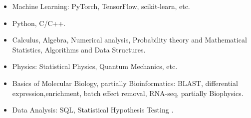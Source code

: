\documentclass[11pt]{article}
\begin{document}
\begin{multicols}{2}
\begin{itemize}
\columnbreak


\begin{itemize}

\item Machine Learning: PyTorch, TensorFlow, scikit-learn, etc.

\item Python, C/C++.

\item Calculus, Algebra, Numerical analysis, Probability theory and Mathematical Statistics, Algorithms and Data Structures.

\item Physics: Statistical Physics, Quantum Mechanics, etc.

\item Basics of Molecular Biology, partially Bioinformatics: BLAST, differential expression,enrichment, batch effect removal, RNA-seq, partially Biophysics.

\item Data Analysis: SQL, Statistical Hypothesis Testing \href{https://github.com/eluator/DataAnalysisInR}{}.

\end{itemize}


\end{itemize}
\end{multicols}
\end{document}
